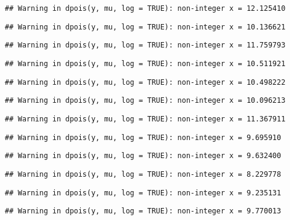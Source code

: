 \documentclass[
]{article}
\begin{document}
\begin{verbatim}
## Warning in dpois(y, mu, log = TRUE): non-integer x = 12.125410
\end{verbatim}

\begin{verbatim}
## Warning in dpois(y, mu, log = TRUE): non-integer x = 10.136621
\end{verbatim}

\begin{verbatim}
## Warning in dpois(y, mu, log = TRUE): non-integer x = 11.759793
\end{verbatim}

\begin{verbatim}
## Warning in dpois(y, mu, log = TRUE): non-integer x = 10.511921
\end{verbatim}

\begin{verbatim}
## Warning in dpois(y, mu, log = TRUE): non-integer x = 10.498222
\end{verbatim}

\begin{verbatim}
## Warning in dpois(y, mu, log = TRUE): non-integer x = 10.096213
\end{verbatim}

\begin{verbatim}
## Warning in dpois(y, mu, log = TRUE): non-integer x = 11.367911
\end{verbatim}

\begin{verbatim}
## Warning in dpois(y, mu, log = TRUE): non-integer x = 9.695910
\end{verbatim}

\begin{verbatim}
## Warning in dpois(y, mu, log = TRUE): non-integer x = 9.632400
\end{verbatim}

\begin{verbatim}
## Warning in dpois(y, mu, log = TRUE): non-integer x = 8.229778
\end{verbatim}

\begin{verbatim}
## Warning in dpois(y, mu, log = TRUE): non-integer x = 9.235131
\end{verbatim}

\begin{verbatim}
## Warning in dpois(y, mu, log = TRUE): non-integer x = 9.770013
\end{verbatim}
\end{document}
